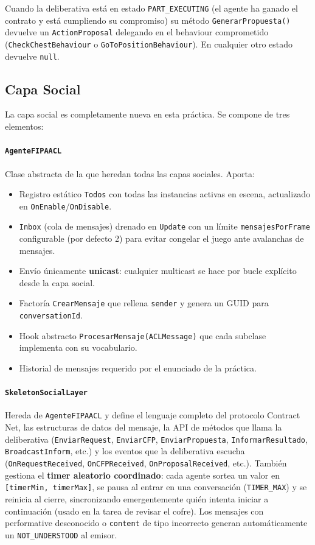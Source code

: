 \documentclass[a4paper,12pt]{article}
\begin{document}
Cuando la deliberativa está en estado \texttt{PART\_EXECUTING} (el agente ha ganado el
contrato y está cumpliendo su compromiso) su método
\texttt{GenerarPropuesta()} devuelve un \texttt{ActionProposal} delegando en el behaviour comprometido (\texttt{CheckChestBehaviour} o \texttt{GoToPositionBehaviour}). En cualquier otro estado devuelve \texttt{null}.

\subsection*{Capa Social}

La capa social es completamente nueva en esta práctica. Se compone de tres elementos:

\paragraph{\texttt{AgenteFIPAACL}} Clase abstracta de la que heredan todas las capas sociales. Aporta:
\begin{itemize}
    \item Registro estático \texttt{Todos} con todas las instancias activas en escena, actualizado en \texttt{OnEnable}/\texttt{OnDisable}.
    \item \texttt{Inbox} (cola de mensajes) drenado en \texttt{Update} con un límite \texttt{mensajesPorFrame} configurable (por defecto 2) para evitar congelar el juego ante avalanchas de mensajes.
    \item Envío únicamente \textbf{unicast}: cualquier multicast se hace por bucle explícito desde la capa social.
    \item Factoría \texttt{CrearMensaje} que rellena \texttt{sender} y genera un GUID para \texttt{conversationId}.
    \item Hook abstracto \texttt{ProcesarMensaje(ACLMessage)} que cada subclase implementa con su vocabulario.
    \item Historial de mensajes requerido por el enunciado de la práctica.
\end{itemize}

\paragraph{\texttt{SkeletonSocialLayer}} Hereda de \texttt{AgenteFIPAACL} y define el lenguaje completo del protocolo Contract Net, las estructuras de datos del mensaje, la API de métodos que llama la deliberativa (\texttt{EnviarRequest}, \texttt{EnviarCFP}, \texttt{EnviarPropuesta}, \texttt{InformarResultado}, \texttt{BroadcastInform}, etc.) y los eventos que la deliberativa escucha (\texttt{OnRequestReceived}, \texttt{OnCFPReceived}, \texttt{OnProposalReceived}, etc.). También gestiona el \textbf{timer aleatorio coordinado}: cada agente sortea un valor en \texttt{[timerMin, timerMax]}, se pausa al entrar en una conversación (\texttt{TIMER\_MAX}) y se reinicia al cierre, sincronizando emergentemente quién intenta iniciar a continuación (usado en la tarea de revisar el cofre). Los mensajes con performative desconocido o \texttt{content} de tipo incorrecto generan automáticamente un \texttt{NOT\_UNDERSTOOD} al emisor.
\end{document}

